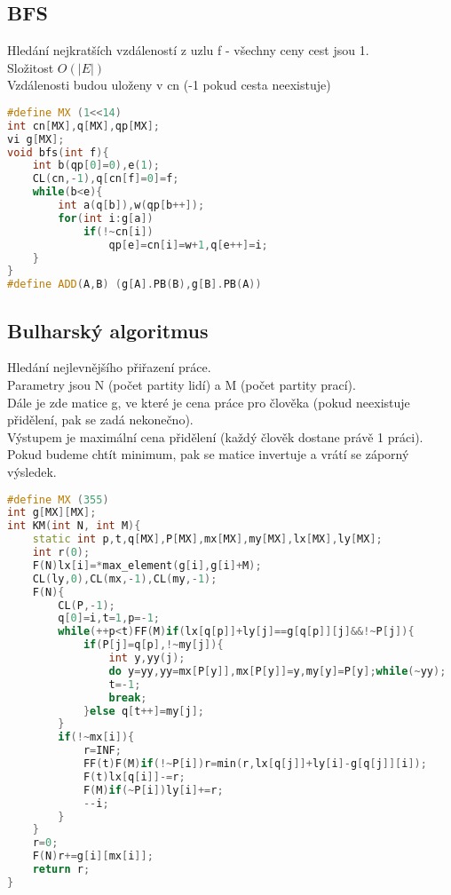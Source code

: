 \documentclass[11pt]{article}
\begin{document}
\subsection{BFS}
Hledání nejkratších vzdáleností z uzlu \textsf{f} - všechny ceny cest jsou 1.
\\Složitost $O(|E|)$
\\Vzdálenosti budou uloženy v \textsf{cn} (-1 pokud cesta neexistuje)
\begin{lstlisting}[language=C++]
#define MX (1<<14)
int cn[MX],q[MX],qp[MX];
vi g[MX];
void bfs(int f){
    int b(qp[0]=0),e(1);
    CL(cn,-1),q[cn[f]=0]=f;
    while(b<e){
        int a(q[b]),w(qp[b++]);
        for(int i:g[a])
            if(!~cn[i])
                qp[e]=cn[i]=w+1,q[e++]=i;
    }
}
#define ADD(A,B) (g[A].PB(B),g[B].PB(A))
\end{lstlisting}
\subsection{Bulharský algoritmus}
Hledání nejlevnějšího přiřazení práce.
\\Parametry jsou \textsf{N} (počet partity lidí) a \textsf{M} (počet partity prací).
\\Dále je zde matice \textsf{g}, ve které je cena práce pro člověka (pokud neexistuje přidělení, pak se zadá nekonečno).
\\Výstupem je maximální cena přidělení (každý člověk dostane právě 1 práci).
\\Pokud budeme chtít minimum, pak se matice invertuje a vrátí se záporný výsledek.
\begin{lstlisting}[language=C++]
#define MX (355)
int g[MX][MX];
int KM(int N, int M){
    static int p,t,q[MX],P[MX],mx[MX],my[MX],lx[MX],ly[MX];
    int r(0);
    F(N)lx[i]=*max_element(g[i],g[i]+M);
    CL(ly,0),CL(mx,-1),CL(my,-1);
    F(N){
        CL(P,-1);
        q[0]=i,t=1,p=-1;
        while(++p<t)FF(M)if(lx[q[p]]+ly[j]==g[q[p]][j]&&!~P[j]){
            if(P[j]=q[p],!~my[j]){
                int y,yy(j);
                do y=yy,yy=mx[P[y]],mx[P[y]]=y,my[y]=P[y];while(~yy);
                t=-1;
                break;
            }else q[t++]=my[j];
        }
        if(!~mx[i]){
            r=INF;
            FF(t)F(M)if(!~P[i])r=min(r,lx[q[j]]+ly[i]-g[q[j]][i]);
            F(t)lx[q[i]]-=r;
            F(M)if(~P[i])ly[i]+=r;
            --i;
        }
    }
    r=0;
    F(N)r+=g[i][mx[i]];
    return r;
}
\end{lstlisting}
\end{document}
